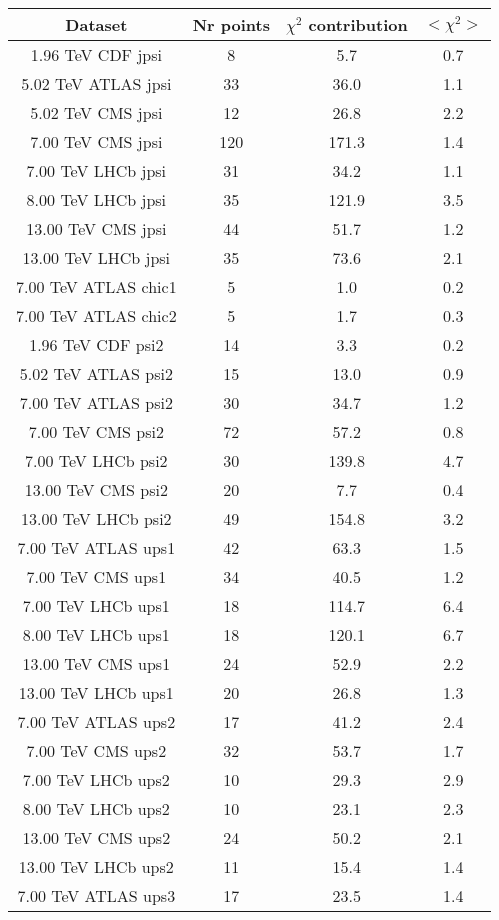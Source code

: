 \begin{table}[h!]
\centering
\begin{tabular}{c|c|c|c}
Dataset & Nr points & $\chi^2$ contribution & $<\chi^2>$ \\
\hline
1.96 TeV CDF jpsi & 8 & 5.7 & 0.7 \\
5.02 TeV ATLAS jpsi & 33 & 36.0 & 1.1 \\
5.02 TeV CMS jpsi & 12 & 26.8 & 2.2 \\
7.00 TeV CMS jpsi & 120 & 171.3 & 1.4 \\
7.00 TeV LHCb jpsi & 31 & 34.2 & 1.1 \\
8.00 TeV LHCb jpsi & 35 & 121.9 & 3.5 \\
13.00 TeV CMS jpsi & 44 & 51.7 & 1.2 \\
13.00 TeV LHCb jpsi & 35 & 73.6 & 2.1 \\
7.00 TeV ATLAS chic1 & 5 & 1.0 & 0.2 \\
7.00 TeV ATLAS chic2 & 5 & 1.7 & 0.3 \\
1.96 TeV CDF psi2 & 14 & 3.3 & 0.2 \\
5.02 TeV ATLAS psi2 & 15 & 13.0 & 0.9 \\
7.00 TeV ATLAS psi2 & 30 & 34.7 & 1.2 \\
7.00 TeV CMS psi2 & 72 & 57.2 & 0.8 \\
7.00 TeV LHCb psi2 & 30 & 139.8 & 4.7 \\
13.00 TeV CMS psi2 & 20 & 7.7 & 0.4 \\
13.00 TeV LHCb psi2 & 49 & 154.8 & 3.2 \\
7.00 TeV ATLAS ups1 & 42 & 63.3 & 1.5 \\
7.00 TeV CMS ups1 & 34 & 40.5 & 1.2 \\
7.00 TeV LHCb ups1 & 18 & 114.7 & 6.4 \\
8.00 TeV LHCb ups1 & 18 & 120.1 & 6.7 \\
13.00 TeV CMS ups1 & 24 & 52.9 & 2.2 \\
13.00 TeV LHCb ups1 & 20 & 26.8 & 1.3 \\
7.00 TeV ATLAS ups2 & 17 & 41.2 & 2.4 \\
7.00 TeV CMS ups2 & 32 & 53.7 & 1.7 \\
7.00 TeV LHCb ups2 & 10 & 29.3 & 2.9 \\
8.00 TeV LHCb ups2 & 10 & 23.1 & 2.3 \\
13.00 TeV CMS ups2 & 24 & 50.2 & 2.1 \\
13.00 TeV LHCb ups2 & 11 & 15.4 & 1.4 \\
7.00 TeV ATLAS ups3 & 17 & 23.5 & 1.4 \\

\end{tabular}
\end{table}
